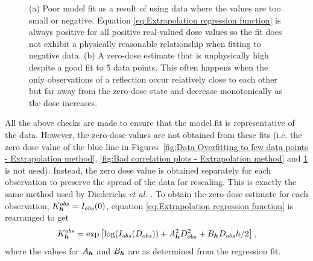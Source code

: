 \begin{figure}
\begin{subfigure}[b]{0.9\textwidth}
        \end{subfigure}
        \caption[Poor regression fits.]{(a) Poor model fit as a result of using data where the values are too small or negative.
        Equation \ref{eq:Extrapolation regression function} is always positive for all positive real-valued dose values so the fit does not exhibit a physically reasonable relationship when fitting to negative data.
        (b) A zero-dose estimate that is unphysically high despite a good fit to 5 data points.
        This often happens when the only observations of a reflection occur relatively close to each other but far away from the zero-dose state and decrease monotonically as the dose increases.}
        \label{fig:Bad Extrapolations, violated checks - Extrapolation method}
\end{figure}

All the above checks are made to ensure that the model fit is representative of the data.
However, the zero-dose values are not obtained from these fits (i.e. the zero dose value of the blue line in Figures~\ref{fig:Data Overfitting to few data points - Extrapolation method}, \ref{fig:Bad correlation plots - Extrapolation method} and \ref{fig:Bad Extrapolations, violated checks - Extrapolation method} is not used).
Instead, the zero dose value is obtained separately for each observation to preserve the spread of the data for rescaling.
This is exactly the same method used by Diederichs \textit{et al.} \cite{diederichs2003}.
To obtain the zero-dose estimate for each observation, $K^{obs}_{\boldsymbol{h}} = I_{obs}(0)$, equation \ref{eq:Extrapolation regression function} is rearranged to get
\begin{equation}
    K^{obs}_{\boldsymbol{h}} = \exp\left[\log(I_{obs}(D_{obs})) + A^2_{\boldsymbol{h}}D^2_{obs} + B_{\boldsymbol{h}} D_{obs} h/2\right],
    \label{eq:Zero-dose extrapolated intensity for each reflection observation}
\end{equation}
where the values for $A_{\boldsymbol{h}}$ and $B_{\boldsymbol{h}}$ are as determined from the regression fit.

